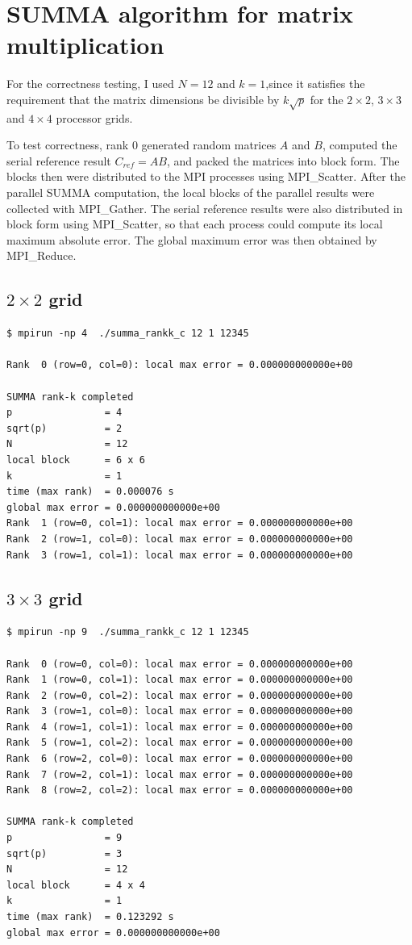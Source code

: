 \documentclass{article}[12pt]
\begin{document}
 
\section{SUMMA algorithm for matrix multiplication}

For the correctness testing, I used $N=12$ and $k=1$,since it satisfies the requirement that the matrix dimensions be divisible by $k\sqrt{p}$ for the $2 \times 2$, $3\times3$ and $4\times4$ processor grids. 

To test correctness, rank 0 generated random matrices $A$ and $B$, computed the serial reference result $C_{ref} = AB$, and packed the matrices into block form. The blocks then were distributed to the MPI processes using MPI\_Scatter. After the parallel SUMMA computation, the local blocks of the parallel results were collected with MPI\_Gather. The serial reference results were also distributed in block form using MPI\_Scatter, so that each process could compute its local maximum absolute error. The global maximum error was then obtained by MPI\_Reduce. 
 

\subsection{$2\times 2$ grid}

\begin{verbatim}
$ mpirun -np 4  ./summa_rankk_c 12 1 12345

Rank  0 (row=0, col=0): local max error = 0.000000000000e+00

SUMMA rank-k completed
p                = 4
sqrt(p)          = 2
N                = 12
local block      = 6 x 6
k                = 1
time (max rank)  = 0.000076 s
global max error = 0.000000000000e+00
Rank  1 (row=0, col=1): local max error = 0.000000000000e+00
Rank  2 (row=1, col=0): local max error = 0.000000000000e+00
Rank  3 (row=1, col=1): local max error = 0.000000000000e+00
\end{verbatim}

\subsection{$3\times 3$ grid}

\begin{verbatim}
$ mpirun -np 9  ./summa_rankk_c 12 1 12345

Rank  0 (row=0, col=0): local max error = 0.000000000000e+00
Rank  1 (row=0, col=1): local max error = 0.000000000000e+00
Rank  2 (row=0, col=2): local max error = 0.000000000000e+00
Rank  3 (row=1, col=0): local max error = 0.000000000000e+00
Rank  4 (row=1, col=1): local max error = 0.000000000000e+00
Rank  5 (row=1, col=2): local max error = 0.000000000000e+00
Rank  6 (row=2, col=0): local max error = 0.000000000000e+00
Rank  7 (row=2, col=1): local max error = 0.000000000000e+00
Rank  8 (row=2, col=2): local max error = 0.000000000000e+00

SUMMA rank-k completed
p                = 9
sqrt(p)          = 3
N                = 12
local block      = 4 x 4
k                = 1
time (max rank)  = 0.123292 s
global max error = 0.000000000000e+00
\end{verbatim}
\end{document}
